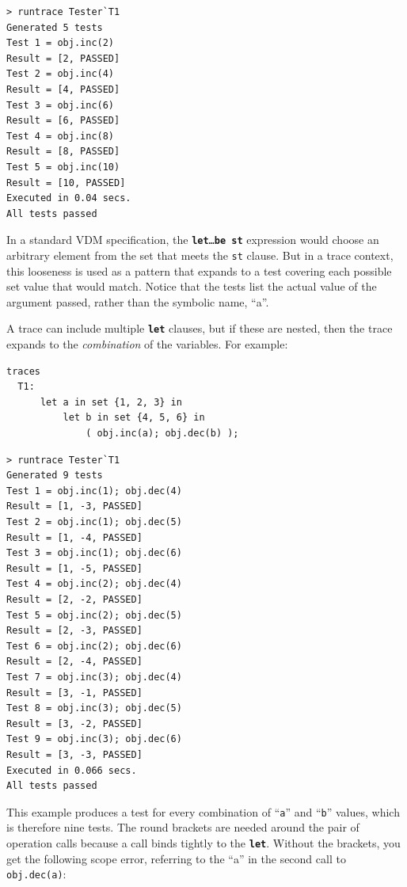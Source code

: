 \documentclass{overturerepchap}
\begin{document}
\lstset{style=tool,language=}
\begin{lstlisting}[escapechar=@]
> runtrace Tester`T1
Generated 5 tests
Test 1 = obj.inc(2)
Result = [2, PASSED]
Test 2 = obj.inc(4)
Result = [4, PASSED]
Test 3 = obj.inc(6)
Result = [6, PASSED]
Test 4 = obj.inc(8)
Result = [8, PASSED]
Test 5 = obj.inc(10)
Result = [10, PASSED]
Executed in 0.04 secs. 
All tests passed
\end{lstlisting}
\lstset{style=mystyle}
\lstset{language=VDM++}
\normalsize

In a standard VDM specification, the \texttt{\textbf{let}\ldots \textbf{be st}} expression would
choose an arbitrary element from the set that meets the \texttt{st} clause. But
in a trace context, this looseness is used as a pattern that expands to a test
covering each possible set value that would match. Notice that the tests list
the actual value of the argument passed, rather than the symbolic name, ``a''.

A trace can include multiple \texttt{\textbf{let}} clauses, but if these are nested, then
the trace expands to the \emph{combination} of the variables. For example:

\small
\begin{lstlisting}
traces
  T1:
      let a in set {1, 2, 3} in
          let b in set {4, 5, 6} in
              ( obj.inc(a); obj.dec(b) );
\end{lstlisting}

\lstset{style=tool,language=}
\begin{lstlisting}[escapechar=@]
> runtrace Tester`T1
Generated 9 tests
Test 1 = obj.inc(1); obj.dec(4)
Result = [1, -3, PASSED]
Test 2 = obj.inc(1); obj.dec(5)
Result = [1, -4, PASSED]
Test 3 = obj.inc(1); obj.dec(6)
Result = [1, -5, PASSED]
Test 4 = obj.inc(2); obj.dec(4)
Result = [2, -2, PASSED]
Test 5 = obj.inc(2); obj.dec(5)
Result = [2, -3, PASSED]
Test 6 = obj.inc(2); obj.dec(6)
Result = [2, -4, PASSED]
Test 7 = obj.inc(3); obj.dec(4)
Result = [3, -1, PASSED]
Test 8 = obj.inc(3); obj.dec(5)
Result = [3, -2, PASSED]
Test 9 = obj.inc(3); obj.dec(6)
Result = [3, -3, PASSED]
Executed in 0.066 secs. 
All tests passed
\end{lstlisting}
\lstset{style=mystyle}
\lstset{language=VDM++}
\normalsize

This example produces a test for every combination of ``\texttt{a}'' and ``\texttt{b}'' values,
which is therefore nine tests. The round brackets are needed around the pair of
operation calls because a call binds tightly to the \texttt{\textbf{let}}. Without the
brackets, you get the following scope error, referring to the ``a'' in the
second call to \texttt{obj.dec(a)}:
\end{document}
